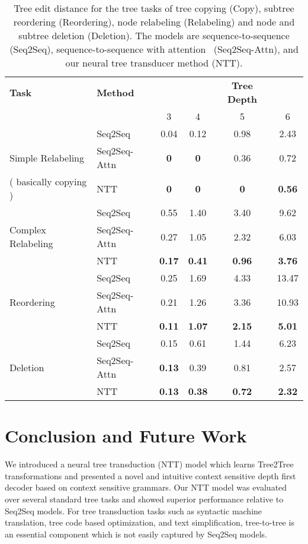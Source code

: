 \documentclass{article}
\newcommand{\jcs}[1]{\noindent{\textcolor{green}{\{{\bf jcs:} {\em #1}\}}}}
\begin{document}

\begin{table*}[tbh!]
    \centering
    \begin{tabular}{l l|c c c c}
         {\bf Task} & {\bf Method} &  & & {\bf Tree Depth} & \\ 
         & & 3 & 4 & 5 & 6 \\ \hline
         & Seq2Seq & 0.04& 0.12 & 0.98 & 2.43\\
         Simple Relabeling & Seq2Seq-Attn & {\bf 0} & {\bf 0} & 0.36 & 0.72 \\
         ( basically copying ) & NTT & {\bf 0} & {\bf 0} & {\bf 0} & {\bf 0.56} \\ \hline
         & Seq2Seq & 0.55 & 1.40 & 3.40 & 9.62\\
         Complex Relabeling & Seq2Seq-Attn & 0.27 & 1.05 & 2.32 & 6.03\\
         & NTT & {\bf 0.17} & {\bf 0.41} & {\bf 0.96} & {\bf 3.76}\\ \hline
         & Seq2Seq & 0.25 & 1.69 & 4.33 & 13.47\\
         Reordering & Seq2Seq-Attn & 0.21 & 1.26 & 3.36 & 10.93 \\
         & NTT & {\bf 0.11} & {\bf 1.07} & {\bf 2.15} & {\bf 5.01}\\ \hline
         & Seq2Seq & 0.15 & 0.61 & 1.44 & 6.23\\
         Deletion & Seq2Seq-Attn & {\bf 0.13} & 0.39 & 0.81 & 2.57\\
         & NTT & {\bf 0.13} & {\bf 0.38} & {\bf 0.72} & {\bf 2.32} \\ \hline
         
         
    \end{tabular}
    \caption{Tree edit distance for the tree tasks of tree copying (Copy), subtree reordering (Reordering),  node relabeling (Relabeling) and node and subtree deletion (Deletion). The models are sequence-to-sequence \citep{sutskever2014sequence} (Seq2Seq), sequence-to-sequence with attention~\citep{bahdanau2014neural} (Seq2Seq-Attn), and our neural tree transducer method (NTT).}
    \label{tab:t2tresults}
\end{table*}

\section{Conclusion and Future Work}
We introduced a neural tree transduction (NTT) model which learns  Tree2Tree transformations and presented a novel and intuitive context sensitive depth first decoder based on context sensitive grammars. Our NTT model was evaluated over several standard tree tasks and showed superior performance relative to Seq2Seq models. For tree transduction tasks such as syntactic machine translation, tree code based optimization, and text simplification, tree-to-tree is an essential component which is not easily captured by Seq2Seq models. 
\end{document}
